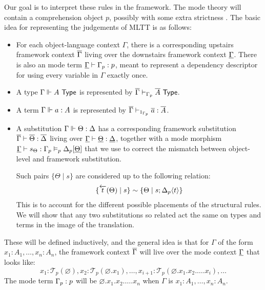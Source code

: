 \documentclass[10pt]{article}
\theoremstyle{definition}
\let\emptyset\varnothing
\newcommand{\yields}{\vdash}
\newcommand{\TYPE}{\,\,\mathsf{Type}}
\newcommand{\rewrite}[2]{\overleftarrow{#1}(#2)}
\newcommand\El[2]{\mathcal{T}_{#1}(#2)}
\newcommand\ap[2]{\ensuremath{#1 \langle #2 \rangle }}
\begin{document}
Our goal is to interpret these rules in the framework. The mode theory will contain a comprehension object $p$, possibly with some extra strictness . The basic idea for representing the judgements of MLTT is as follows:
\begin{itemize}
\item For each object-language context $\Gamma$, there is a corresponding upstairs framework context $\overline{\Gamma}$ living over the downstairs framework context $\underline{\Gamma}$. There is also an mode term $\downstairs{\Gamma} \yields \asdep{\Gamma} : p$, meant to represent a dependency descriptor for using every variable in $\Gamma$ exactly once.

\item A type $\Gamma \qyields A \TYPE$ is represented by $\upstairs{\Gamma} \yields_{\asdep{\Gamma}} \upstairs{A} \TYPE$.
  
\item A term $\Gamma \Vdash a : A$ is represented by $\upstairs{\Gamma} \yields_{1_{\asdep{\Gamma}}} \upstairs{a} : \upstairs{A}$.

\item A substitution $\Gamma \Vdash \Theta : \Delta$ has a corresponding framework substitution $\upstairs{\Gamma} \yields \upstairs{\Theta} : \upstairs{\Delta}$ living over $\downstairs{\Gamma} \yields \downstairs{\Theta} : \downstairs{\Delta}$, together with a mode morphism $\downstairs{\Gamma} \yields s_\Theta : \asdep{\Gamma} \vDash_p \asdep{\Delta}[\downstairs{\Theta}]$ that we use to correct the mismatch between object-level and framework substitution.

Such pairs $\{ \Theta \mid s \}$ are considered up to the following relation:
\begin{align*}
\{ \rewrite{t}{\Theta} \mid s \} \sim \{ \Theta \mid s ; \ap{\asdep{\Delta}}{t} \}
\end{align*}
This is to account for the different possible placements of the structural rules. We will show that any two substitutions so related act the same on types and terms in the image of the translation.
\end{itemize}

These will be defined inductively, and the general idea is that for $\Gamma$ of the form $x_1 : A_1, \ldots , x_n : A_n$, the framework context $\overline{\Gamma}$ will live over the mode context $\underline{\Gamma}$ that looks like:
  \[x_1 : \El{p}{\emptyset}, x_2 : \El{p}{\emptyset.x_1}, \ldots, x_{i+1} : \El{p}{\emptyset.x_1.x_2.\ldots.x_i},\ldots
  \]
  The mode term ${\Gamma}_p : p$ will be $\emptyset.x_1.x_2.\ldots.x_n$ when $\Gamma$ is $x_1 : A_1, \ldots , x_n : A_n$.
\end{document}

